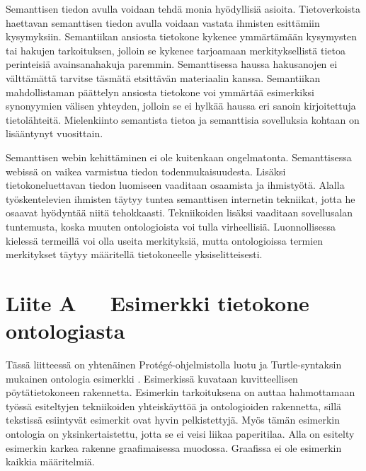 \documentclass[finnish, 12pt, a4paper, elec, utf8, pdfa, online]{aaltothesis}
\begin{document}
{Semanttisen tiedon avulla voidaan tehdä monia hyödyllisiä asioita. Tietoverkoista haettavan semanttisen tiedon avulla voidaan vastata ihmisten esittämiin kysymyksiin. Semantiikan ansiosta tietokone kykenee ymmärtämään kysymysten tai hakujen tarkoituksen, jolloin se kykenee tarjoamaan merkityksellistä tietoa perinteisiä avainsanahakuja paremmin. Semanttisessa haussa hakusanojen ei välttämättä tarvitse täsmätä etsittävän materiaalin kanssa. Semantiikan mahdollistaman päättelyn ansiosta tietokone voi ymmärtää esimerkiksi synonyymien välisen yhteyden, jolloin se ei hylkää haussa eri sanoin kirjoitettuja tietolähteitä. Mielenkiinto semantista tietoa ja semanttisia sovelluksia kohtaan on lisääntynyt vuosittain.

Semanttisen webin kehittäminen ei ole kuitenkaan ongelmatonta. Semanttisessa webissä on vaikea varmistua tiedon todenmukaisuudesta. Lisäksi tietokoneluettavan tiedon luomiseen vaaditaan osaamista ja ihmistyötä. Alalla työskentelevien ihmisten täytyy tuntea semanttisen internetin tekniikat, jotta he osaavat hyödyntää niitä tehokkaasti. Tekniikoiden lisäksi vaaditaan sovellusalan tuntemusta, koska muuten ontologioista voi tulla virheellisiä. Luonnollisessa kielessä termeillä voi olla useita merkityksiä, mutta ontologioissa termien merkitykset täytyy määritellä tietokoneelle yksiselitteisesti.

\clearpage

\clearpage
\thesisappendix
\section*{Liite A\ \ \ Esimerkki tietokone ontologiasta \label{Liite A}}

Tässä liitteessä on yhtenäinen Protégé-ohjelmistolla luotu ja Turtle-syntaksin mukainen ontologia esimerkki \cite{Protege}. Esimerkissä kuvataan kuvitteellisen pöytätietokoneen rakennetta. Esimerkin tarkoituksena on auttaa hahmottamaan työssä esiteltyjen tekniikoiden yhteiskäyttöä ja ontologioiden rakennetta, sillä tekstissä esiintyvät esimerkit ovat hyvin pelkistettyjä. Myös tämän esimerkin ontologia on yksinkertaistettu, jotta se ei veisi liikaa paperitilaa. Alla on esitelty esimerkin karkea rakenne graafimaisessa muodossa. Graafissa ei ole esimerkin kaikkia määritelmiä.

}
\end{document}
